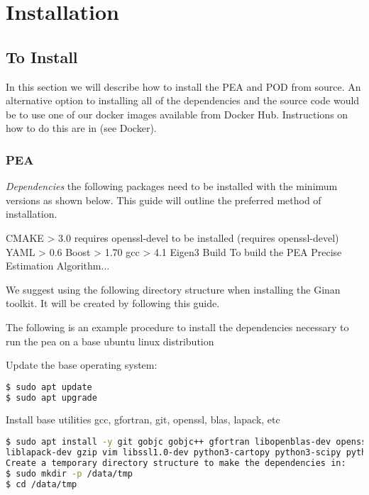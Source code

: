 \chapter{Installation}
\label{ch:installation}


\section{To Install} 

In this section we will describe how to install the PEA and POD from source. An alternative option to installing all of the dependencies and the source code would be to use one of our docker images available from Docker Hub. Instructions on how to do this are in (see Docker).

\subsection{PEA}


\textit{Dependencies} the following packages need to be installed with the minimum versions as shown below. This guide will outline the preferred method of installation.

CMAKE  > 3.0 requires openssl-devel to be installed (requires openssl-devel)
YAML   > 0.6
Boost  > 1.70
gcc    > 4.1
Eigen3
Build
To build the PEA Precise Estimation Algorithm...

We suggest using the following directory structure when installing the Ginan toolkit. It will be created by following this guide.


The following is an example procedure to install the dependencies necessary to run the pea on a base ubuntu linux distribution

Update the base operating system:

\begin{lstlisting}[language=bash]
$ sudo apt update
$ sudo apt upgrade
\end{lstlisting}

Install base utilities gcc, gfortran, git, openssl, blas, lapack, etc
\begin{lstlisting}[language=bash]
$ sudo apt install -y git gobjc gobjc++ gfortran libopenblas-dev openssl curl net-tools openssh-server cmake make \
liblapack-dev gzip vim libssl1.0-dev python3-cartopy python3-scipy python3-matplotlib python3-mpltoolkits.basemap
Create a temporary directory structure to make the dependencies in:
$ sudo mkdir -p /data/tmp
$ cd /data/tmp
\end{lstlisting}

